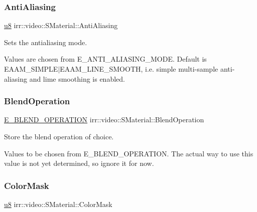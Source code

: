 \subsubsection{\texorpdfstring{Anti\+Aliasing}{AntiAliasing}}
{\footnotesize\ttfamily \hyperlink{namespaceirr_a646874f69af8ff87fc10201b0254a761}{u8} irr\+::video\+::\+S\+Material\+::\+Anti\+Aliasing}



Sets the antialiasing mode. 

Values are chosen from E\+\_\+\+A\+N\+T\+I\+\_\+\+A\+L\+I\+A\+S\+I\+N\+G\+\_\+\+M\+O\+DE. Default is E\+A\+A\+M\+\_\+\+S\+I\+M\+P\+L\+E$\vert$\+E\+A\+A\+M\+\_\+\+L\+I\+N\+E\+\_\+\+S\+M\+O\+O\+TH, i.\+e. simple multi-\/sample anti-\/aliasing and lime smoothing is enabled. \mbox{\label{classirr_1_1video_1_1SMaterial_afbef5b333fd3af57649cf11ab575fa26}} 
\subsubsection{\texorpdfstring{Blend\+Operation}{BlendOperation}}
{\footnotesize\ttfamily \hyperlink{namespaceirr_1_1video_a6d78c1faed23a03e8ef7b7b623bbaf2f}{E\+\_\+\+B\+L\+E\+N\+D\+\_\+\+O\+P\+E\+R\+A\+T\+I\+ON} irr\+::video\+::\+S\+Material\+::\+Blend\+Operation}



Store the blend operation of choice. 

Values to be chosen from E\+\_\+\+B\+L\+E\+N\+D\+\_\+\+O\+P\+E\+R\+A\+T\+I\+ON. The actual way to use this value is not yet determined, so ignore it for now. \mbox{\label{classirr_1_1video_1_1SMaterial_a5a4833b515b453c592224d89356dbc01}} 
\subsubsection{\texorpdfstring{Color\+Mask}{ColorMask}}
{\footnotesize\ttfamily \hyperlink{namespaceirr_a646874f69af8ff87fc10201b0254a761}{u8} irr\+::video\+::\+S\+Material\+::\+Color\+Mask}




